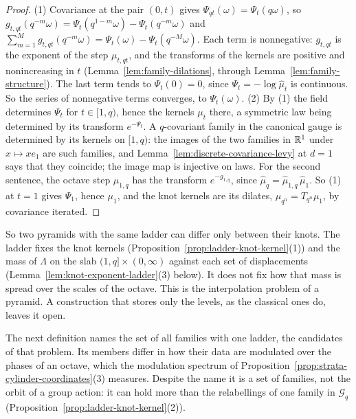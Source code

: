 \begin{proof}
(1) Covariance at the pair $(0, t)$ gives $\Psi_{qt}(\omega) = \Psi_t(q\omega)$, so
$g_{t,qt}(q^{-m}\omega) = \Psi_t(q^{1-m}\omega) - \Psi_t(q^{-m}\omega)$ and
$\sum_{m=1}^{M}g_{t,qt}(q^{-m}\omega) = \Psi_t(\omega) - \Psi_t(q^{-M}\omega)$. Each term is
nonnegative: $g_{t,qt}$ is the exponent of the step $\mu_{t,qt}$, and the transforms of the kernels
are positive and nonincreasing in $t$ (Lemma~\ref{lem:family-dilations}, through
Lemma~\ref{lem:family-structure}). The last term tends to $\Psi_t(0) = 0$, since
$\Psi_t = -\log\widehat\mu_t$ is continuous. So the series of nonnegative terms converges, to
$\Psi_t(\omega)$.
(2) By (1) the field determines $\Psi_t$ for $t \in [1,q)$, hence the kernels $\mu_t$ there, a
symmetric law being determined by its transform $e^{-\Psi_t}$. A $q$-covariant family in the
canonical gauge is determined by its kernels on $[1, q)$: the images of the two families in $\mathbb{R}^1$
under $x \mapsto xe_1$ are such families, and Lemma~\ref{lem:discrete-covariance-levy} at $d = 1$
says that they coincide; the image map is injective on laws. For the second sentence, the
octave step $\mu_{1,q}$ has the transform $e^{-g_{1,q}}$, since $\widehat\mu_q = \widehat\mu_{1,q}\,
\widehat\mu_1$. So (1) at $t = 1$ gives $\Psi_1$, hence $\mu_1$, and the knot kernels are its dilates,
$\mu_{q^n} = T_{q^n}\mu_1$, by covariance iterated.
\end{proof}

So two pyramids with the same ladder can differ only between their knots. The ladder fixes the
knot kernels (Proposition~\ref{prop:ladder-knot-kernel}(1)) and the mass of $\Lambda$ on the slab
$(1,q] \times (0,\infty)$ against each set of displacements (Lemma~\ref{lem:knot-exponent-ladder}(3)
below). It does not fix how that mass is spread over the scales of the octave. This is the
interpolation problem of a pyramid. A construction that stores only the levels, as the classical
ones do, leaves it open.

The next definition names the set of all families with one ladder, the candidates of that problem.
Its members differ in how their \Levy{} data are modulated over the phases of an octave, which the
modulation spectrum of Proposition~\ref{prop:strata-cylinder-coordinates}(3) measures. Despite the
name it is a set of families, not the orbit of a group action: it can hold more than the
relabellings of one family in $\mathcal{G}_q$ (Proposition~\ref{prop:ladder-knot-kernel}(2)).

